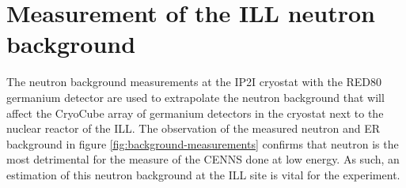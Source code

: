 \section{Measurement of the ILL neutron background}
\label{par:ill-neutron-background}

The neutron background measurements at the IP2I cryostat with the RED80 germanium detector are used to extrapolate the neutron background that will affect the CryoCube array of germanium detectors in the \Ricochet{} cryostat next to the nuclear reactor of the ILL. The observation of the measured neutron and ER background in figure \ref{fig:background-measurements} confirms that neutron is the most detrimental  for the measure of the CENNS done at low energy. As such, an estimation of this neutron background at the ILL site is vital for the \Ricochet{} experiment.

